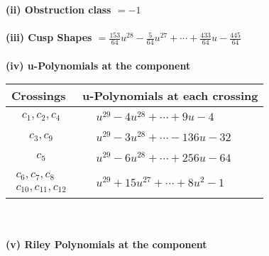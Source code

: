 \documentclass[1p]{elsarticle_modified}
\theoremstyle{definition}
\begin{document}
\flushleft \textbf{(ii) Obstruction class $= -1$}\\~\\
\flushleft \textbf{(iii) Cusp Shapes $= \frac{153}{64} u^{28}-\frac{5}{64} u^{27}+\cdots+\frac{433}{64} u-\frac{445}{64}$}\\~\\
\newpage\renewcommand{\arraystretch}{1}
\flushleft \textbf{(iv) u-Polynomials at the component}\newline \\
\begin{tabular}{m{50pt}|m{274pt}}
Crossings & \hspace{64pt}u-Polynomials at each crossing \\
\hline $$\begin{aligned}c_{1},c_{2},c_{4}\end{aligned}$$&$\begin{aligned}
&u^{29}-4 u^{28}+\cdots+9 u-4
\end{aligned}$\\
\hline $$\begin{aligned}c_{3},c_{9}\end{aligned}$$&$\begin{aligned}
&u^{29}-3 u^{28}+\cdots-136 u-32
\end{aligned}$\\
\hline $$\begin{aligned}c_{5}\end{aligned}$$&$\begin{aligned}
&u^{29}-6 u^{28}+\cdots+256 u-64
\end{aligned}$\\
\hline $$\begin{aligned}c_{6},c_{7},c_{8}\\c_{10},c_{11},c_{12}\end{aligned}$$&$\begin{aligned}
&u^{29}+15 u^{27}+\cdots+8 u^2-1
\end{aligned}$\\
\hline
\end{tabular}\\~\\
\newpage\renewcommand{\arraystretch}{1}
\flushleft \textbf{(v) Riley Polynomials at the component}\newline \\
\end{document}
